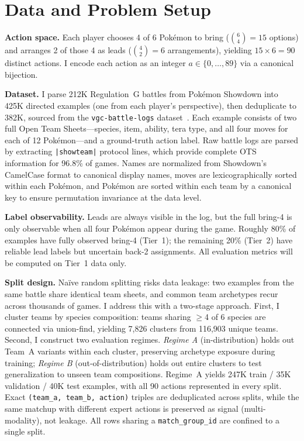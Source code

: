 \documentclass[11pt]{article}
\begin{document}
\section{Data and Problem Setup}
\label{sec:data}

\textbf{Action space.}
Each player chooses 4 of 6 Pok\'emon to bring ($\binom{6}{4} = 15$ options) and arranges 2 of those 4 as leads ($\binom{4}{2} = 6$ arrangements), yielding $15 \times 6 = 90$ distinct actions.
I encode each action as an integer $a \in \{0, \ldots, 89\}$ via a canonical bijection.

\textbf{Dataset.}
I parse 212K Regulation~G battles from Pok\'emon Showdown into 425K directed examples (one from each player's perspective), then deduplicate to 382K, sourced from the \texttt{vgc-battle-logs} dataset~\cite{vgcbench}.
Each example consists of two full Open Team Sheets---species, item, ability, tera type, and all four moves for each of 12 Pok\'emon---and a ground-truth action label.
Raw battle logs are parsed by extracting \texttt{|showteam|} protocol lines, which provide complete OTS information for 96.8\% of games.
Names are normalized from Showdown's CamelCase format to canonical display names, moves are lexicographically sorted within each Pok\'emon, and Pok\'emon are sorted within each team by a canonical key to ensure permutation invariance at the data level.

\textbf{Label observability.}
Leads are always visible in the log, but the full bring-4 is only observable when all four Pok\'emon appear during the game.
Roughly 80\% of examples have fully observed bring-4 (Tier~1); the remaining 20\% (Tier~2) have reliable lead labels but uncertain back-2 assignments.
All evaluation metrics will be computed on Tier~1 data only.

\textbf{Split design.}
Na\"ive random splitting risks data leakage: two examples from the same battle share identical team sheets, and common team archetypes recur across thousands of games.
I address this with a two-stage approach.
First, I cluster teams by species composition: teams sharing $\geq$4 of 6 species are connected via union-find, yielding 7,826 clusters from 116,903 unique teams.
Second, I construct two evaluation regimes.
\emph{Regime A} (in-distribution) holds out Team~A variants within each cluster, preserving archetype exposure during training; \emph{Regime B} (out-of-distribution) holds out entire clusters to test generalization to unseen team compositions.
Regime~A yields 247K train / 35K validation / 40K test examples, with all 90 actions represented in every split.
Exact \texttt{(team\_a, team\_b, action)} triples are deduplicated across splits, while the same matchup with different expert actions is preserved as signal (multi-modality), not leakage.
All rows sharing a \texttt{match\_group\_id} are confined to a single split.
\end{document}
